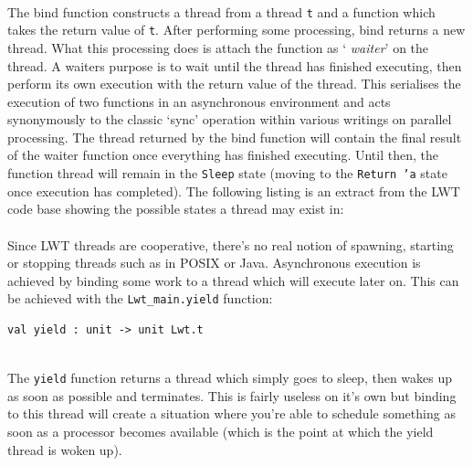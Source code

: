 \documentclass[12pt,twoside,notitlepage]{report}
\begin{document}
\hfill\\
The bind function constructs a thread from a thread {\tt t} and a function which takes the return value of {\tt t}. After performing some processing, bind returns a new thread. What this processing does is attach the function as `{\em
waiter}' on the thread. A waiters purpose is to wait until the thread has finished executing, then perform its own execution with the return value of the thread. This serialises the execution of two functions in an asynchronous
environment and acts synonymously to the classic `sync' operation within various writings on parallel processing\cite{cormen2009}. The thread returned by the bind function will contain the final result of the waiter function once
everything has finished executing. Until then, the function thread will remain in the {\tt Sleep} state (moving to the {\tt Return 'a} state once execution has completed). The following listing is an extract from the LWT code base
showing the possible states a thread may exist in:
\hfill\\

\hfill\\
Since LWT threads are cooperative, there's no real notion of spawning, starting or stopping threads such as in POSIX or Java. Asynchronous execution is achieved by binding some work to a thread which will execute later on. This can be
achieved with the {\tt Lwt\_main.yield} function:
\hfill\\
\begin{lstlisting}
val yield : unit -> unit Lwt.t
\end{lstlisting}
\hfill\\
The {\tt yield} function returns a thread which simply goes to sleep, then wakes up as soon as possible and terminates. This is fairly useless on it's own but binding to this thread will create a situation where you're able to
schedule something as soon as a processor becomes available (which is the point at which the yield thread is woken up).
\end{document}
